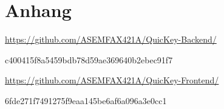 \section*{Anhang}

\anhangsverzeichnis


\begin{compactitem}
    \item \url{https://github.com/ASEMFAX421A/QuicKey-Backend/}
    \item c400415f8a5459bdb78d59ae369640b2ebec91f7
    \item \url{https://github.com/ASEMFAX421A/QuicKey-Frontend/}
    \item 6fde271f7491275f9eaa145be6af6a096a3e0cc1
 \end{compactitem}


